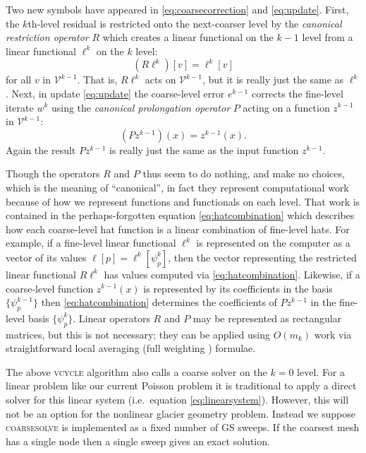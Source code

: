 \documentclass[letterpaper,final,12pt,reqno]{amsart}
\begin{document}
Two new symbols have appeared in \eqref{eq:coarsecorrection} and \eqref{eq:update}.  First, the $k$th-level residual is restricted onto the next-coarser level by the \emph{canonical restriction operator} $R$ which creates a linear functional on the $k-1$ level from a linear functional $\ell^k$ on the $k$ level:
\begin{equation}
  (R \ell^k)[v] = \ell^k[v] \label{eq:canonicalrestriction}
\end{equation}
for all $v$ in $\mathcal{V}^{k-1}$.  That is, $R \ell^k$ acts on $\mathcal{V}^{k-1}$, but it is really just the same as $\ell^k$.  Next, in update \eqref{eq:update} the coarse-level error $e^{k-1}$ corrects the fine-level iterate $w^k$ using the \emph{canonical prolongation operator} $P$ acting on a function $z^{k-1}$ in $\mathcal{V}^{k-1}$:
\begin{equation}
  (P z^{k-1})(x) = z^{k-1}(x). \label{eq:canonicalprolongation}
\end{equation}
Again the result $P z^{k-1}$ is really just the same as the input function $z^{k-1}$.

Though the operators $R$ and $P$ thus seem to do nothing, and make no choices, which is the meaning of ``canonical'', in fact they represent computational work because of how we represent functions and functionals on each level.  That work is contained in the perhaps-forgotten equation \eqref{eq:hatcombination} which describes how each coarse-level hat function is a linear combination of fine-level hats.  For example, if a fine-level linear functional $\ell^k$ is represented on the computer as a vector of its values $\ell[p] = \ell^k[\psi_p^k]$, then the vector representing the restricted linear functional $R \ell^k$ has values computed via \eqref{eq:hatcombination}.  Likewise, if a coarse-level function $z^{k-1}(x)$ is represented by its coefficients in the basis $\{\psi_p^{k-1}\}$ then \eqref{eq:hatcombination} determines the coefficients of $P z^{k-1}$ in the fine-level basis $\{\psi_p^k\}$.  Linear operators $R$ and $P$ may be represented as rectangular matrices, but this is not necessary; they can be applied using $O(m_k)$ work via straightforward local averaging (full weighting \cite{Briggsetal2000}) formulae.

The above \textsc{vcycle} algorithm also calls a coarse solver on the $k=0$ level.  For a linear problem like our current Poisson problem it is traditional to apply a direct solver for this linear system (i.e.~equation \eqref{eq:linearsystem}).  However, this will not be an option for the nonlinear glacier geometry problem.  Instead we suppose \textsc{coarsesolve} is implemented as a fixed number of GS sweeps.  If the coarsest mesh has a single node then a single sweep gives an exact solution.
\end{document}
